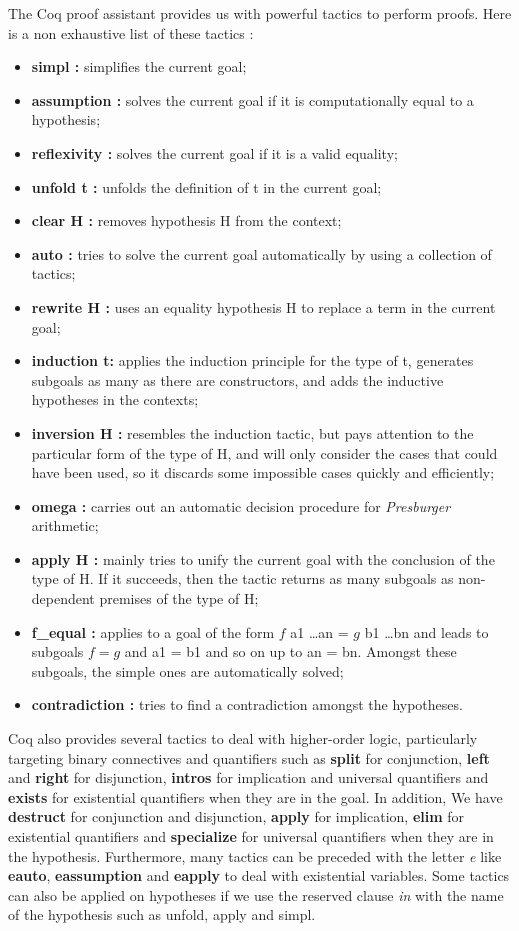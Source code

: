 The Coq proof assistant provides us with powerful tactics to perform proofs. Here is a non exhaustive list of these tactics :
\begin{itemize}
\item \textbf{simpl :} simplifies the current goal;
	\item \textbf{assumption :} solves the current goal if it is computationally equal to a hypothesis;
	\item \textbf{reflexivity :} solves the current goal if it is a valid equality;
	\item \textbf{unfold t :} unfolds the definition of t in the current goal;
	\item \textbf{clear H :} removes hypothesis H from the context;
	\item \textbf{auto :} tries to solve the current goal automatically by using a collection of tactics;
	\item \textbf{rewrite H :} uses an equality hypothesis H to replace a term in the current goal;	
	\item \textbf{induction t:} applies the induction principle for the type of t, generates subgoals as many as there are constructors, and adds the inductive hypotheses in the contexts;
	\item \textbf{inversion H :} resembles the induction tactic, but pays attention to the particular form of the type of H, and will only consider the cases that could have been used, so it discards some impossible cases quickly and efficiently;
	\item \textbf{omega :} carries out an automatic decision procedure for \textit{Presburger} arithmetic;
	\item \textbf{apply H :} mainly tries to unify the current goal with the conclusion of the type of H. If it succeeds, then the tactic returns as many subgoals as non-dependent premises of the type of H;
	\item \textbf{f\_equal :} applies to a goal of the form $f$ a{\tiny 1} \dots a{\tiny n} = $g$ b{\tiny 1} \dots b{\tiny n} and leads to subgoals $f = g$ and a{\tiny 1} = b{\tiny 1} and so on up to a{\tiny n} = b{\tiny n}. Amongst these subgoals, the simple ones are automatically solved;
	\item \textbf{contradiction :} tries to find a contradiction amongst the hypotheses.	
\end{itemize}
Coq also provides several tactics to deal with higher-order logic, particularly targeting binary connectives and quantifiers such as \textbf{split} for conjunction, \textbf{left} and \textbf{right} for disjunction, \textbf{intros} for implication and universal quantifiers and \textbf{exists} for existential quantifiers when they are in the goal. In addition, We have \textbf{destruct} for conjunction and disjunction, \textbf{apply} for implication, \textbf{elim} for existential quantifiers and \textbf{specialize} for universal quantifiers when they are in the hypothesis. Furthermore, many tactics can be preceded with the letter \textit{e} like \textbf{eauto}, \textbf{eassumption} and \textbf{eapply} to deal with existential variables. Some tactics can also be applied on hypotheses if we use the reserved clause \textit{in} with the name of the hypothesis such as unfold, apply and simpl. 
